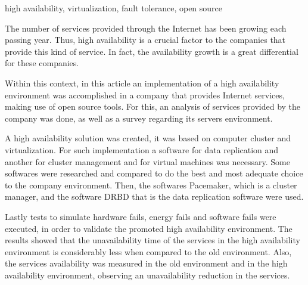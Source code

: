 \begin{englishabstract}{}{high availability, virtualization, fault tolerance, open source}

The number of services provided through the Internet has been growing each passing year. Thus, high availability is a crucial factor to the 
companies that provide this kind of service. In fact, the availability growth is a great differential for these companies.

Within this context, in this article an implementation of a high availability environment was accomplished in a company that provides 
Internet services, making use of open source tools. For this, an analysis of services provided by the company was done, 
as well as a survey regarding its servers environment.

A high availability solution was created, it was based on computer cluster and virtualization.
For such implementation a software for data replication and another for cluster management and for virtual machines was necessary. 
Some softwares were researched and compared to do the best and most adequate choice to the company environment.
Then, the softwares Pacemaker, which is a cluster manager, and the software DRBD that is the data replication software were used.

Lastly tests to simulate hardware fails, energy fails and software fails were executed, in order to validate the promoted high availability
environment. The results showed that the unavailability time of the services in the high availability environment is considerably less when 
compared to the old environment. Also, the services availability was measured in the old environment and in the high availability environment, 
observing an unavailability reduction in the services.

\end{englishabstract}
